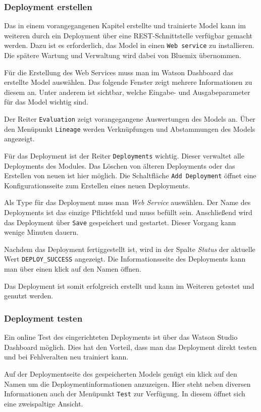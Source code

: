 \subsubsection{Deployment erstellen}
Das in einem vorangegangenen Kapitel erstellte und trainierte Model kann im weiteren durch ein Deployment über eine
REST-Schnittstelle verfügbar gemacht werden. Dazu ist es erforderlich, das Model in einen \texttt{Web service} zu
installieren. Die spätere Wartung und Verwaltung wird dabei von Bluemix übernommen.

Für die Erstellung des Web Services muss man im Watson Dashboard das erstellte Model auswählen. Das folgende Fenster
zeigt mehrere Informationen zu diesem an. Unter anderem ist sichtbar, welche Eingabe- und Ausgabeparameter für das Model
wichtig sind.

Der Reiter \texttt{Evaluation} zeigt vorangegangene Auswertungen des Models an. Über den Menüpunkt \texttt{Lineage}
werden Verknüpfungen und Abstammungen des Models angezeigt.

Für das Deployment ist der Reiter \texttt{Deployments} wichtig. Dieser verwaltet alle Deployments des Modules. Das Löschen
von älteren Deployments oder das Erstellen von neuen ist hier möglich. Die Schaltfläche \texttt{Add Deployment} öffnet
eine Konfigurationsseite zum Erstellen eines neuen Deployments.

Als Type für das Deployment muss man \textit{Web Service} auswählen. Der Name des Deployments ist das einzige Pflichtfeld
und muss befüllt sein. Anschließend wird das Deployment über \texttt{Save} gespeichert und gestartet. Dieser Vorgang kann
wenige Minuten dauern.

Nachdem das Deployment fertiggestellt ist, wird in der Spalte \textit{Status} der aktuelle Wert \texttt{DEPLOY\_SUCCESS}
angezeigt. Die Informationsseite des Deployments kann man über einen klick auf den Namen öffnen.

Das Deployment ist somit erfolgreich erstellt und kann im Weiteren getestet und genutzt werden.

\subsubsection{Deployment testen}
Ein online Test des eingerichteten Deployments ist über das Watson Studio Dashboard möglich. Dies hat den Vorteil, dass
man das Deployment direkt testen und bei Fehlveralten neu trainiert kann.

Auf der Deploymentseite des gespeicherten Models genügt ein klick auf den Namen um die Deploymentinformationen anzuzeigen.
Hier steht neben diversen Informationen auch der Menüpunkt \texttt{Test} zur Verfügung. In diesem öffnet sich eine
zweispaltige Ansicht.

